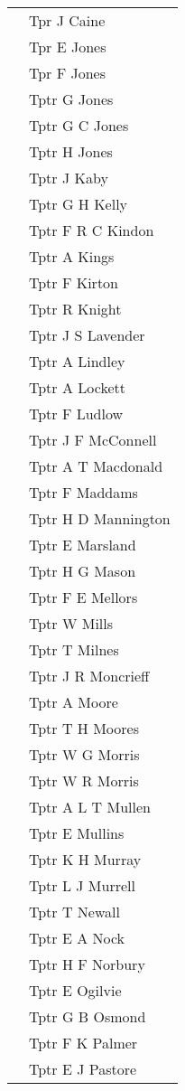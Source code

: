 \begin{center}
\begin{tabular}{rl}
    & Tpr J Caine \\
    & Tpr E Jones \\
    & Tpr F Jones \\
    & Tptr G Jones \\
    & Tptr G C Jones \\
    & Tptr H Jones \\
    & Tptr J Kaby \\
    & Tptr G H Kelly \\
    & Tptr F R C Kindon \\
    & Tptr A Kings \\
    & Tptr F Kirton \\
    & Tptr R Knight \\
    & Tptr J S Lavender \\
    & Tptr A Lindley \\
    & Tptr A Lockett \\
    & Tptr F Ludlow \\
    & Tptr J F McConnell \\
    & Tptr A T Macdonald \\
    & Tptr F Maddams \\
    & Tptr H D Mannington \\
    & Tptr E Marsland \\
    & Tptr H G Mason \\
    & Tptr F E Mellors \\
    & Tptr W Mills \\
    & Tptr T Milnes \\
    & Tptr J R Moncrieff \\
    & Tptr A Moore \\
    & Tptr T H Moores \\
    & Tptr W G Morris \\
    & Tptr W R Morris \\
    & Tptr A L T Mullen \\
    & Tptr E Mullins \\
    & Tptr K H Murray \\
    & Tptr L J Murrell \\
    & Tptr T Newall \\
    & Tptr E A Nock \\
    & Tptr H F Norbury \\
    & Tptr E Ogilvie \\
    & Tptr G B Osmond \\
    & Tptr F K Palmer \\
    & Tptr E J Pastore \\

\end{tabular}
\end{center}
